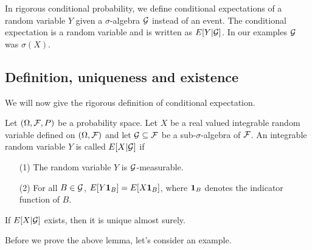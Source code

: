In rigorous conditional probability, we define conditional expectations of a random variable $Y$ given a $\sigma$-algebra ${\mathcal{G}}$ instead of an event. The conditional expectation is a random variable and is written as $E[Y|{\mathcal{G}}]$. In our examples ${\mathcal{G}}$ was $\sigma(X)$.

\subsection{Definition, uniqueness and existence}
We will now give the rigorous definition of conditional expectation.
\begin{definition}
    Let $({{\Omega}},{\mathcal{F}},P)$ be a probability space. Let $X$ be a real valued integrable random variable defined on $({{\Omega}},{\mathcal{F}})$ and let ${\mathcal{G}} \subseteq {\mathcal{F}}$ be a sub-$\sigma$-algebra of ${\mathcal{F}}$. An integrable random variable $Y$ is called $E[X|{\mathcal{G}}]$ if
    \begin{enumerate}
        \item[(1)] The random variable $Y$ is ${\mathcal{G}}$-measurable.
        \item[(2)] For all $B \in {\mathcal{G}}$, $E[Y{{\bf 1}}_B]=E[X{{\bf 1}}_B ]$, where ${{\bf 1}}_B$ denotes the indicator function of $B$.  
    \end{enumerate}
\end{definition}
\begin{lemma}\label{uniqueness-lemma}
    If $E[X|{\mathcal{G}}]$ exists, then it is unique almost surely.
\end{lemma}
Before we prove the above lemma, let's consider an example.
